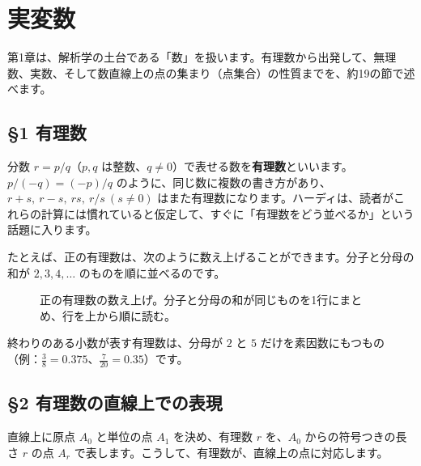 \documentclass[a4paper,11pt,openany]{ltjsbook}
\begin{document}
\chapter{実変数}

第1章は、解析学の土台である「数」を扱います。有理数から出発して、無理数、実数、そして数直線上の点の集まり（点集合）の性質までを、約19の節で述べます。

\section{§1 有理数}

分数 $r=p/q$（$p,q$ は整数、$q\ne0$）で表せる数を\textbf{有理数}といいます。$p/(-q)=(-p)/q$ のように、同じ数に複数の書き方があり、$r+s,\ r-s,\ rs,\ r/s\ (s\ne0)$ はまた有理数になります。ハーディは、読者がこれらの計算には慣れていると仮定して、すぐに「有理数をどう並べるか」という話題に入ります。

たとえば、正の有理数は、次のように数え上げることができます。分子と分母の和が $2,3,4,\ldots$ のものを順に並べるのです。

\begin{figure}[htbp]
\centering
{}
\caption{正の有理数の数え上げ。分子と分母の和が同じものを1行にまとめ、行を上から順に読む。}
\end{figure}

終わりのある小数が表す有理数は、分母が $2$ と $5$ だけを素因数にもつもの（例：$\frac38=0.375$、$\frac{7}{20}=0.35$）です。

\section{§2 有理数の直線上での表現}

直線上に原点 $A_0$ と単位の点 $A_1$ を決め、有理数 $r$ を、$A_0$ からの符号つきの長さ $r$ の点 $A_r$ で表します。こうして、有理数が、直線上の点に対応します。
\end{document}

